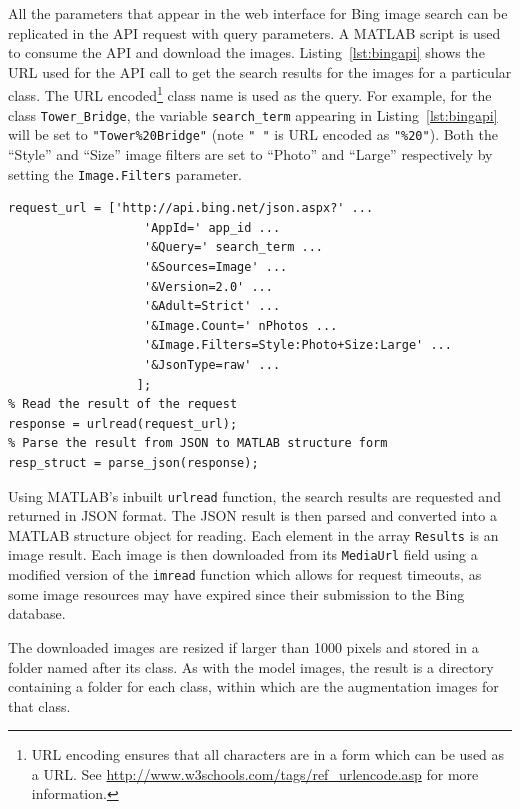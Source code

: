 \documentclass[11pt, onecolumn, a4paper, final]{report} %
\begin{document}
All the parameters that appear in the web interface for Bing image search can be replicated in the API request with query parameters. A MATLAB script is used to consume the API and download the images. Listing~\ref{lst:bingapi} shows the URL used for the API call to get the search results for the images for a particular class. The URL encoded\footnote{URL encoding ensures that all characters are in a form which can be used as a URL. See \url{http://www.w3schools.com/tags/ref_urlencode.asp} for more information.} class name is used as the query. For example, for the class \lstinline!Tower_Bridge!, the variable \lstinline!search_term! appearing in Listing~\ref{lst:bingapi} will be set to \lstinline!"Tower%20Bridge"! (note \lstinline{" "} is URL encoded as \lstinline{"%20"}). Both the ``Style'' and ``Size'' image filters are set to ``Photo'' and ``Large'' respectively by setting the \lstinline!Image.Filters! parameter.

\linespread{1} %
\lstset{language=Matlab,caption=A Bing image search API request.,label=lst:bingapi}
\begin{lstlisting}[frame=single]
%% MATLAB
request_url = ['http://api.bing.net/json.aspx?' ...
                   'AppId=' app_id ...
                   '&Query=' search_term ...
                   '&Sources=Image' ...
                   '&Version=2.0' ...
                   '&Adult=Strict' ...
                   '&Image.Count=' nPhotos ...
                   '&Image.Filters=Style:Photo+Size:Large' ...
                   '&JsonType=raw' ...
                  ];
% Read the result of the request
response = urlread(request_url);
% Parse the result from JSON to MATLAB structure form
resp_struct = parse_json(response);
\end{lstlisting}
\linespread{2} %

Using MATLAB's inbuilt \lstinline!urlread! function, the search results are requested and returned in JSON format. The JSON result is then parsed and converted into a MATLAB structure object for reading. Each element in the array \lstinline!Results! is an image result. Each image is then downloaded from its \lstinline!MediaUrl! field using a modified version of the \lstinline!imread! function which allows for request timeouts, as some image resources may have expired since their submission to the Bing database.

The downloaded images are resized if larger than 1000 pixels and stored in a folder named after its class. As with the model images, the result is a directory containing a folder for each class, within which are the augmentation images for that class.
\end{document}
